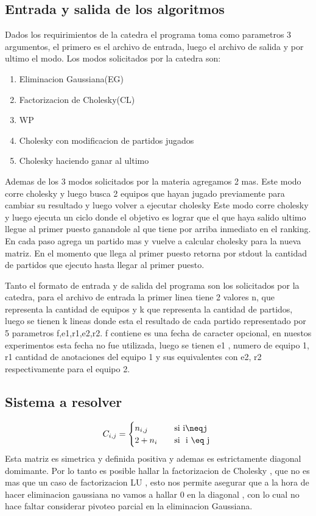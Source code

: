 \subsection{Entrada y salida de los algoritmos}

Dados los requirimientos de la catedra el programa toma como parametros 3 argumentos, el primero es el archivo de entrada, luego el archivo de salida y
por ultimo el modo. Los modos solicitados por la catedra son:
\begin{enumerate}
    \item Eliminacion Gaussiana(EG)
\item Factorizacion de Cholesky(CL)
    \item WP
    \item Cholesky con modificacion de partidos jugados
    \item Cholesky haciendo ganar al ultimo
    \end{enumerate}
    Ademas de los 3 modos solicitados por la materia agregamos 2 mas.
    Este modo corre cholesky y luego busca 2 equipos que hayan jugado previamente para cambiar su resultado y luego volver a ejecutar cholesky
    Este modo corre cholesky y luego ejecuta un ciclo donde el objetivo es lograr que el que haya salido ultimo llegue al primer puesto ganandole
    al que tiene por arriba inmediato en el ranking. En cada paso agrega un partido mas y vuelve a calcular cholesky para la nueva matriz.
    En el momento que llega al primer puesto retorna por stdout la cantidad de partidos que ejecuto hasta llegar al primer puesto.

    Tanto el formato de entrada y de salida del programa son los solicitados por la catedra, para el archivo de entrada la primer linea tiene 2 valores n,
    que representa la cantidad de equipos  y k que representa la cantidad de partidos,
    luego se tienen k lineas donde esta el resultado de cada partido representado por 5 parametros f,e1,r1,e2,r2.
    f contiene es una fecha de caracter opcional, en nuestos experimentos esta fecha no fue utilizada, luego se tienen e1 , numero de equipo 1,
    r1 cantidad de anotaciones del equipo 1 y sus equivalentes con e2, r2 respectivamente para el equipo 2.


\subsection{Sistema a resolver}

    \[ C_{i,j} =
    \begin{cases}
        n_{i,j}       & \quad \text{si }  \text{i\neqj}\\
        2+n_i & \quad \text{si } \text{ i \eq j }\\
    \end{cases}
    \]
Esta matriz es simetrica y definida positiva y ademas es estrictamente diagonal domimante.
Por lo tanto es posible hallar la factorizacion de Cholesky , que no es mas que un caso
de factorizacion LU , esto nos permite asegurar que a la hora de hacer eliminacion 
gaussiana no vamos a hallar 0 en la diagonal , con lo cual no hace faltar considerar
pivoteo parcial en la eliminacion Gaussiana.  

